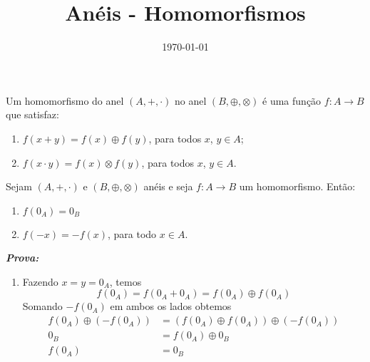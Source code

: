 \documentclass{beamer}
\title{Anéis - Homomorfismos}
\author[\autor]{\autor}
\institute[\instituto]{\instituto}
\date{\today}
\begin{document}
    \begin{frame}
        \maketitle
    \end{frame}

    
    \begin{frame}
        \begin{definicao}
            Um homomorfismo do anel $(A, +, \cdot)$ no anel $(B, \oplus, \otimes)$ {\'e} uma fun{\c c}{\~a}o $f : A \to B$ que satisfaz:
            \begin{enumerate}[label={\roman*})]
                \item $f(x + y) = f(x) \oplus f(y)$, para todos $x$, $y \in A$;

                \vspace{.5cm}
                
                \item $f(x \cdot y) = f(x)\otimes f(y)$, para todos $x$, $y \in A$.
                
                \vspace{.5cm}
            \end{enumerate}
        \end{definicao}
    \end{frame}

    \begin{frame}
        \begin{proposicao}
            Sejam $(A, +, \cdot)$ e $(B, \oplus, \otimes)$ an\'eis e seja $f : A \to B$ um homomorfismo. Ent{\~a}o:
            \begin{enumerate}[label={\roman*})]
                \item $f(0_{A}) = 0_{B}$

                \vspace{.5cm}

                \item $f(-x) = -f(x)$, para todo $x \in A$.
            \end{enumerate}
        \end{proposicao}

        \noindent \textbf{\textit{Prova: }}
        \begin{enumerate}[label={\roman*})]
            \item Fazendo $x = y = 0_{A}$, temos
            \[
                f(0_A) = f(0_A + 0_A) = f(0_A) \oplus f(0_A)
             \]
            Somando $-f(0_A)$ em ambos os lados obtemos
            \begin{align*}
                f(0_A) \oplus (-f(0_A)) &= (f(0_A)\oplus f(0_A)) \oplus (-f(0_A))\\
                0_B &= f(0_A) \oplus 0_B\\
                f(0_A) &= 0_B
            \end{align*}
        \seti
        \end{enumerate}
    \end{frame}
\end{document}
